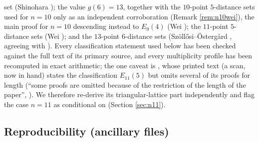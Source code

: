 \documentclass[11pt]{article}
\theoremstyle{definition}
\theoremstyle{remark}
\begin{document}
\begin{itemize}
set (Shinohara \cite{Shinohara08}); the value $g(6) = 13$, together with the $10$-point
$5$-distance sets used for $n = 10$ only as an independent corroboration (Remark
\ref{rem:n10wei}), the main proof for $n = 10$ descending instead to $E_9(4)$
(Wei \cite{Wei12}); the $11$-point $5$-distance sets (Wei \cite{Wei11}); and the
$13$-point $6$-distance sets (Sz\"oll\H{o}si--\"Osterg\aa rd \cite{SzOs20}, agreeing
with \cite{Wei12}). Every classification statement used below has been checked against the
full text of its primary source, and every multiplicity profile has been recomputed in
exact arithmetic; the one caveat is \cite{Wei11}, whose printed text (a scan, now in hand)
states the classification $E_{11}(5)$ but omits several of its proofs for length (``some
proofs are omitted because of the restriction of the length of the paper'',
\cite[p.~506]{Wei11}). We therefore re-derive its triangular-lattice part independently
and flag the case $n = 11$ as conditional on \cite{Wei11} (Section \ref{sec:n11}).
\end{itemize}

\subsection*{Reproducibility (ancillary files)}
\end{document}
